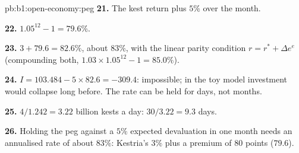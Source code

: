 \begin{solution}{pb:b1:open-economy:peg}
\textbf{21.} The kest return plus $5\%$ over the month.

\textbf{22.} $1.05^{12} - 1 = 79.6\%$.

\textbf{23.} $3 + 79.6 = 82.6\%$, about $83\%$, with the linear parity condition
$r = r^* + \Delta e^e$ (compounding both, $1.03 \times 1.05^{12} - 1 = 85.0\%$).

\textbf{24.} $I = 103.484 - 5 \times 82.6 = -309.4$: impossible; in the toy model investment would
collapse long before. The rate can be held for days, not months.

\textbf{25.} $4/1.242 = 3.22$ billion kests a day: $30/3.22 = 9.3$ days.

\textbf{26.} Holding the peg against a $5\%$ expected devaluation in one month
needs an annualised rate of about $83\%$: Kestria's $3\%$ plus a premium of 80
points ($79.6$).
\end{solution}
